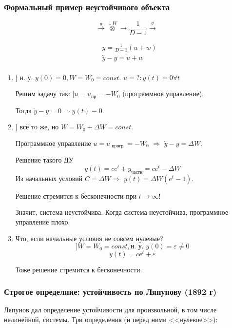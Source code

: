 \documentclass[main.tex]{subfiles}
\begin{document}
\subsubsection{Формальный пример неустойчивого объекта}

$$ \xrightarrow{u} \overset{\downarrow W}{\otimes} \rightarrow \boxed{\frac{1}{D-1}} \xrightarrow{y} $$

\begin{align*}
    & y = \frac{1}{D-1}(u+w) \\
    & \dot y - y = u + w \\
\end{align*}

\begin{enumerate}
    \item ] н. у. $y(0)=0, W=W_0=const$.
    $u=? : y(t)=0 \forall t$

    Решим задачу так: $ ] u = u_{\text{пр}} = - W_0 $ (программное управление).

    Тогда $ \dot y - y = 0 \Rightarrow y(t) \equiv 0 $.

    \item ] всё то же, но $ W = W_0 + \Delta W = const $.

    Программное управление $ u = u_{\text{ прогр }} = - W_0 $ $ \Rightarrow $ $ \dot y - y = \Delta W $.

    Решение такого ДУ
    \[ y(t) = c e^t + y_{\text{частн}} = ce^t - \Delta W  \]
    Из начальных условий $ C = \Delta W  \Rightarrow $ $ y(t) = \Delta W (e^t - 1) $.

    Решение стремится к бесконечности при $t \to \infty $!

    Значит, система неустойчива.
    Когда система неустойчива, программное управление плохо.

    \item Что, если начальные условия не совсем нулевые?
    \[ ] W = W_0 = const, \text{н. у. } y(0) = \varepsilon \ne 0 \]
    \[ y(t) = ce^t + \varepsilon \]

    Тоже решение стремится к бесконечности.
\end{enumerate}

\subsubsection{Строгое определние: устойчивость по Ляпунову (1892 г)}

Ляпунов дал определение устойчивости для произвольной, в том числе нелинейной, системы.
Три определения (и перед ними <<нулевое>>):
\end{document}
